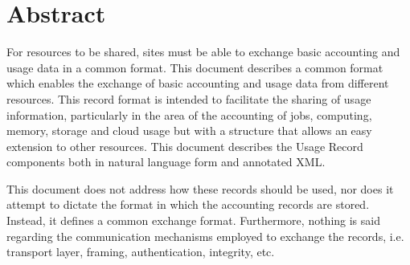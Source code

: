 \section*{Abstract}

For resources to be shared, sites must be able to exchange basic accounting and usage data in a common format. This document describes a common format which enables the exchange of basic accounting and usage data from different resources. This record format is intended to facilitate the sharing of usage information, particularly in the area of the accounting of jobs, computing, memory, storage and cloud usage but with a structure that allows an easy extension to other resources. This document describes the Usage Record components both in natural language form and annotated XML.

This document does not address how these records should be used, nor does it attempt to dictate the format in which the accounting records are stored. Instead, it defines a common exchange format. Furthermore, nothing is said regarding the communication mechanisms employed to exchange the records, i.e. transport layer, framing, authentication, integrity, etc.
